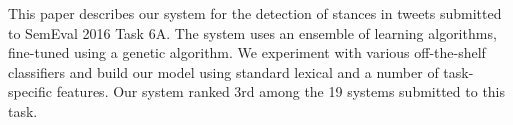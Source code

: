 This paper describes our system for the detection of stances in tweets submitted to SemEval 2016 Task 6A. The system uses an ensemble of learning algorithms, fine-tuned using a genetic algorithm. We experiment with various off-the-shelf classifiers and build our model using standard lexical and a number of task-specific features. Our system ranked 3rd among the 19 systems submitted to this task.
